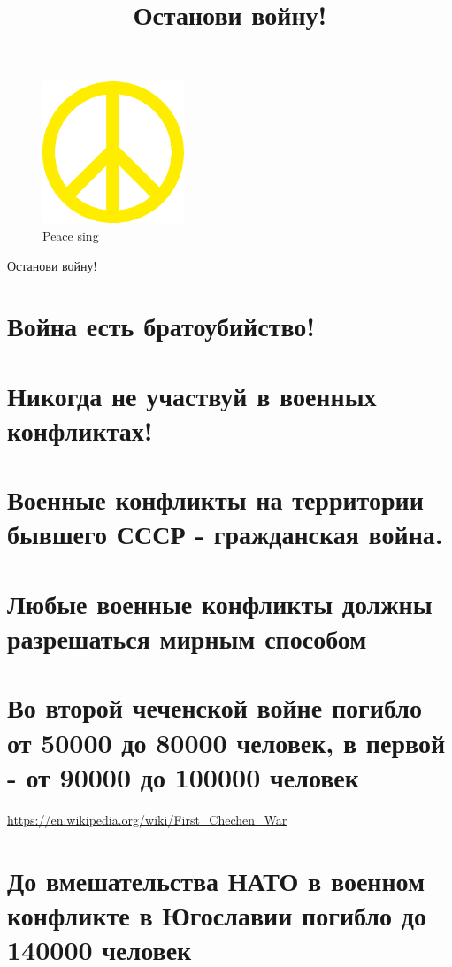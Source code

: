 \documentclass[10pt,a4paper]{article}
\title{Останови войну!}
\begin{document}
\begin{figure}[t]
  \centering
  \includegraphics[width=120pt]{./pacific.png}
  \caption{Peace sing}
  \label{fig:Pacific_sign}
\end{figure}



\begin{center}
{\LARGE Останови войну!}
\end{center}

\section{Война есть братоубийство!}

\section{Никогда не участвуй в военных конфликтах!}

\section{Военные конфликты на территории бывшего СССР - гражданская война.}

\section{Любые военные конфликты должны разрешаться мирным способом}

\section{Во второй чеченской войне погибло от 50000 до 80000 человек, в первой - от 90000 до 100000 человек}

\href{https://en.wikipedia.org/wiki/First\_Chechen\_War}
{https://en.wikipedia.org/wiki/First\_Chechen\_War}

\section{До вмешательства НАТО в военном конфликте в Югославии погибло до 140000 человек}
\end{document}
